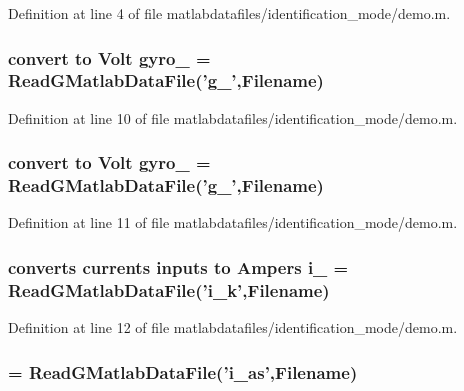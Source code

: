 Definition at line 4 of file matlabdatafiles/identification\_\-mode/demo.m.
\subsubsection[{gyro\_\-1}]{\setlength{\rightskip}{0pt plus 5cm}convert to Volt {\bf gyro\_} = ReadGMatlabDataFile('g\_',{\bf Filename})}\label{matlabdatafiles_2identification__mode_2demo_8m_a7b87420d64643d8ca83979e62b103643}


Definition at line 10 of file matlabdatafiles/identification\_\-mode/demo.m.
\subsubsection[{gyro\_\-2}]{\setlength{\rightskip}{0pt plus 5cm}convert to Volt {\bf gyro\_} = ReadGMatlabDataFile('g\_',{\bf Filename})}\label{matlabdatafiles_2identification__mode_2demo_8m_af4f547b37792776499225c3278e381a2}


Definition at line 11 of file matlabdatafiles/identification\_\-mode/demo.m.
\subsubsection[{i\_\-1}]{\setlength{\rightskip}{0pt plus 5cm}converts currents inputs to Ampers {\bf i\_} = ReadGMatlabDataFile('{\bf i\_\-k}',{\bf Filename})}\label{matlabdatafiles_2identification__mode_2demo_8m_af9e7d4a08f65a50f2fca548e896e70c5}


Definition at line 12 of file matlabdatafiles/identification\_\-mode/demo.m.
\subsubsection[{i\_\-2}]{ = ReadGMatlabDataFile('{\bf i\_\-as}',{\bf Filename})}\label{matlabdatafiles_2identification__mode_2demo_8m_a0dc010b9e612b60013fbb0684b755b6d}


